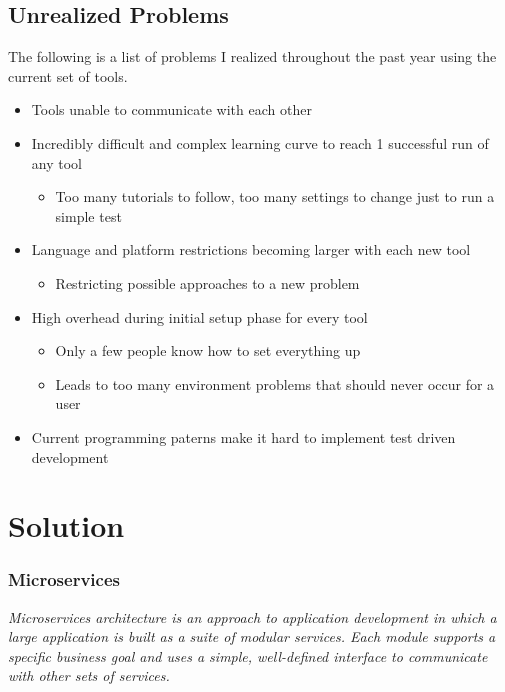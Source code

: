 \documentclass[12pt]{article}
\begin{document}
\subsection{Unrealized Problems}\label{unrealized-problems}

The following is a list of problems I realized throughout the past year
using the current set of tools.

\begin{itemize}
\item
  Tools unable to communicate with each other
\item
  Incredibly difficult and complex learning curve to reach 1 successful
  run of any tool

  \begin{itemize}
  \tightlist
  \item
    Too many tutorials to follow, too many settings to change just to
    run a simple test
  \end{itemize}
\item
  Language and platform restrictions becoming larger with each new tool

  \begin{itemize}
  \tightlist
  \item
    Restricting possible approaches to a new problem
  \end{itemize}
\item
  High overhead during initial setup phase for every tool

  \begin{itemize}
  \item
    Only a few people know how to set everything up
  \item
    Leads to too many environment problems that should never occur for a
    user
  \end{itemize}
\item
  Current programming paterns make it hard to implement test driven
  development
\end{itemize}

\section{Solution}\label{solution}

\subsubsection{Microservices}\label{microservices}

\emph{Microservices architecture is an approach to application
development in which a large application is built as a suite of modular
services. Each module supports a specific business goal and uses a
simple, well-defined interface to communicate with other sets of
services.} \citep{searchMicroservices}
\end{document}
